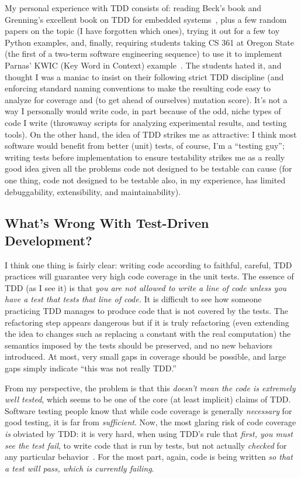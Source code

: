 \documentclass[sigplan,screen]{acmart}
\begin{document}
My personal experience with TDD consists of:  reading Beck's book and
Grenning's excellent book on TDD for embedded systems~\cite{grenning},
plus a few random papers on the topic (I have forgotten which ones), trying it
out for a few toy Python examples, and, finally, requiring students taking CS 361 at
Oregon State (the first of a two-term software engineering sequence)
to use it to implement Parnas' KWIC (Key Word in Context) example~\cite{parnas1972criteria}.
The students hated it, and thought I was a maniac to insist on their
following strict TDD discipline (and enforcing standard naming conventions
to make the resulting code easy to analyze for coverage and (to get
ahead of ourselves) mutation score).  It's not a way I personally
would write code, in part because of the odd, niche types of code I
write (throwaway scripts for analyzing experimental results, and
testing tools).  On the other hand, the idea of TDD strikes me as
attractive:  I think most software would benefit from better (unit)
tests, of course, I'm a ``testing guy''; writing tests before
implementation to ensure testability strikes me as a really good idea
given all the problems code not designed to be testable can cause (for
one thing, code not designed to be testable also, in my experience,
has limited debuggability, extensibility, and maintainability).


\subsection{What's Wrong With Test-Driven Development?}

I think one thing is fairly clear:  writing code according to
faithful, careful, TDD practices will guarantee very high code
coverage in the unit tests.  The essence of TDD (as I see it) is that
\emph{you are not allowed to write a line of code unless you have a
  test that tests that line of code.}  It is difficult to see how
someone practicing TDD manages to produce code that is not covered by
the tests.  The refactoring step appears dangerous but if it is truly
refactoring (even extending the idea to changes such as replacing a
constant with the real computation) the semantics imposed by the tests
should be preserved, and no new behaviors introduced.  At most, very
small gaps in coverage should be possible, and large gaps simply
indicate ``this was not really TDD.''

From my perspective, the problem is that this \emph{doesn't mean the
  code is extremely well tested}, which seems to be one of the core
(at least implicit) claims of TDD.  Software testing people know that
while code coverage is generally \emph{necessary} for good testing, it
is far from \emph{sufficient}.  Now, the most glaring risk of code
coverage \emph{is} obviated by TDD:  it is very hard, when using TDD's
rule that \emph{first, you must see the test fail}, to write code
that is run by tests, but not actually \emph{checked} for any
particular behavior~\cite{Schuler2011AssessingOQ}.  For the most part,
again, code is being written \emph{so that a test will pass, which is
  currently failing}.
\end{document}
